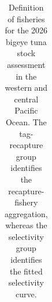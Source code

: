 \documentclass[
  english,
  a4paper,
  a4paper,
  11pt]{SCreport}
\providecommand{\DIFaddbegin}{} %
\providecommand{\DIFdelend}{} %
\newcommand{\DIFaddincludegraphics}[2][]{{\color{blue}\fbox{\DIFOincludegraphics[#1]{#2}}}} %
\DeclareRobustCommand{\DIFaddbegin}{\DIFOaddbegin \let\includegraphics\DIFaddincludegraphics} %
\DeclareRobustCommand{\DIFdelend}{\DIFOaddend \let\includegraphics\DIFOincludegraphics} %
\begin{document}
\begin{landscape}
\DIFdelend \DIFaddbegin \begin{longtable}{@{}>{\raggedleft\arraybackslash}p{0.04\linewidth}>{\raggedright\arraybackslash}p{0.18\linewidth}>{\raggedleft\arraybackslash}p{0.04\linewidth}>{\raggedright\arraybackslash}p{0.08\linewidth}>{\raggedleft\arraybackslash}p{0.09\linewidth}>{\raggedleft\arraybackslash}p{0.09\linewidth}>{\raggedright\arraybackslash}p{0.12\linewidth}>{\raggedleft\arraybackslash}p{0.05\linewidth}@{}}

\caption{\label{tbl-fisheries-definitions}Definition of fisheries for the 2026 bigeye tuna stock assessment in the western and central Pacific Ocean. The tag-recapture group identifies the recapture-fishery aggregation, whereas the selectivity group identifies the fitted selectivity curve.}

\tabularnewline


\end{longtable}
\end{landscape}
\end{document}
